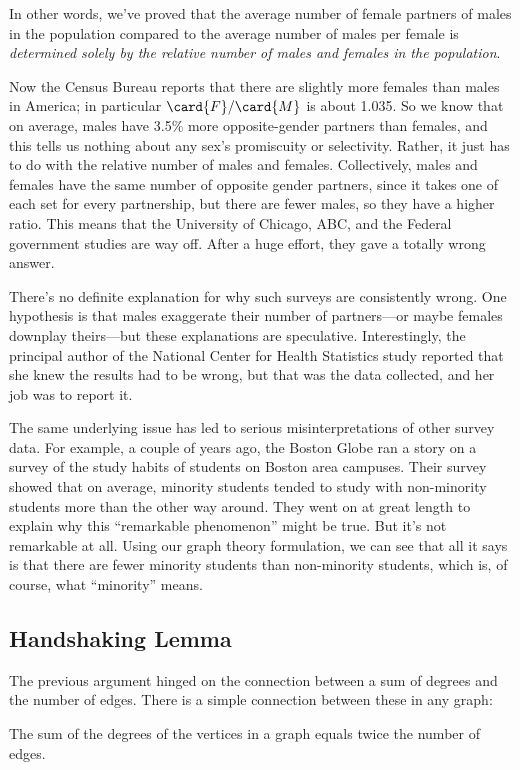 In other words, we've proved that the average number of female
partners of males in the population compared to the average number of
males per female is \emph{determined solely by the relative number of
  males and females in the population}.

Now the Census Bureau reports that there are slightly more females
than males in America; in particular $\card{F} / \card{M}$ is about
1.035.  So we know that on average, males have 3.5\% more
opposite-gender partners than females, and this tells us nothing about
any sex's promiscuity or selectivity.  Rather, it just has to do with
the relative number of males and females.  Collectively, males and
females have the same number of opposite gender partners, since it
takes one of each set for every partnership, but there are fewer
males, so they have a higher ratio.  This means that the University of
Chicago, ABC, and the Federal government studies are way off.  After a
huge effort, they gave a totally wrong answer.

There's no definite explanation for why such surveys are consistently
wrong.  One hypothesis is that males exaggerate their number of
partners---or maybe females downplay theirs---but these explanations
are speculative.  Interestingly, the principal author of the National
Center for Health Statistics study reported that she knew the results
had to be wrong, but that was the data collected, and her job was to
report it.

The same underlying issue has led to serious misinterpretations of
other survey data.  For example, a couple of years ago, the Boston
Globe ran a story on a survey of the study habits of students on
Boston area campuses.  Their survey showed that on average, minority
students tended to study with non-minority students more than the
other way around.  They went on at great length to explain why this
``remarkable phenomenon'' might be true.  But it's not remarkable at
all.  Using our graph theory formulation, we can see that all it says
is that there are fewer minority students than non-minority students,
which is, of course, what ``minority'' means.

\subsection{Handshaking Lemma}
The previous argument hinged on the connection between a sum of
degrees and the number of edges.  There is a simple connection between
these in any graph:

\begin{lemma}\label{sumedges}
The sum of the degrees of the vertices in a graph equals twice the number of edges.
\end{lemma}

